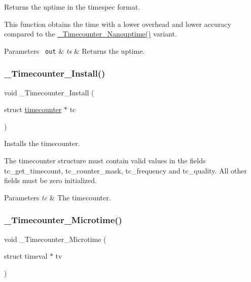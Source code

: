 Returns the uptime in the timespec format. 

This function obtains the time with a lower overhead and lower accuracy compared to the \mbox{\hyperlink{group__RTEMSScoreTimecounter_ga69193b209ce281570491732c00be6cb9}{\+\_\+\+Timecounter\+\_\+\+Nanouptime()}} variant.


\begin{DoxyParams}[1]{Parameters}
\mbox{\texttt{ out}}  & {\em ts} & Returns the uptime. \\
\hline
\end{DoxyParams}
\mbox{\label{group__RTEMSScoreTimecounter_ga9e8609916ba1b0f683b25b3b7874c531}} 
\subsubsection{\texorpdfstring{\_Timecounter\_Install()}{\_Timecounter\_Install()}}
{\footnotesize\ttfamily void \+\_\+\+Timecounter\+\_\+\+Install (\begin{DoxyParamCaption}\item[{struct \mbox{\hyperlink{structtimecounter}{timecounter}} $\ast$}]{tc }\end{DoxyParamCaption})}



Installs the timecounter. 

The timecounter structure must contain valid values in the fields tc\+\_\+get\+\_\+timecount, tc\+\_\+counter\+\_\+mask, tc\+\_\+frequency and tc\+\_\+quality. All other fields must be zero initialized.


\begin{DoxyParams}{Parameters}
{\em tc} & The timecounter. \\
\hline
\end{DoxyParams}
\mbox{\label{group__RTEMSScoreTimecounter_ga186755758b9fbe63a174ddf24eec5986}} 
\subsubsection{\texorpdfstring{\_Timecounter\_Microtime()}{\_Timecounter\_Microtime()}}
{\footnotesize\ttfamily void \+\_\+\+Timecounter\+\_\+\+Microtime (\begin{DoxyParamCaption}\item[{struct timeval $\ast$}]{tv }\end{DoxyParamCaption})}



